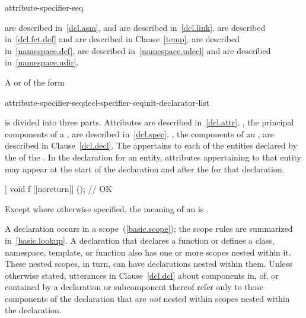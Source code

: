 \begin{bnf}
\br
    \terminal{;}
\end{bnf}

\begin{bnf}
\br
    attribute-specifier-seq \terminal{;}
\end{bnf}

\enternote
{} are described in~\ref{dcl.asm}, and
 are described in~\ref{dcl.link}.
 are described in~\ref{dcl.fct.def} and
 are described in Clause~\ref{temp}.
 are described in~\ref{namespace.def},
 are described in~\ref{namespace.udecl} and
 are described in~\ref{namespace.udir}.
\exitnote

\pnum
A
 or
 of the form

\begin{ncsimplebnf}
attribute-specifier-seq\opt decl-specifier-seq\opt init-declarator-list\opt \terminal{;}
\end{ncsimplebnf}

is divided into three parts.
Attributes are described in~\ref{dcl.attr}.
, the principal components of
a , are described in~\ref{dcl.spec}.
, the components of an
, are described in Clause~\ref{dcl.decl}.
The 
appertains to each of the entities declared by
the 
of the .
\enternote In the declaration for an entity, attributes appertaining to that
entity may appear at the start of the declaration and after the
 for that declaration.
\exitnote \enterexample
\begin{codeblock}
[[noreturn]] void f [[noreturn]] (); // OK
\end{codeblock}
\exitexample

\pnum
Except where otherwise specified, the meaning of an 
is .

\pnum
{}%
%
A declaration occurs in a scope~(\ref{basic.scope}); the scope rules are
summarized in~\ref{basic.lookup}. A declaration that declares a function
or defines a class, namespace, template, or function also has one or
more scopes nested within it. These nested scopes, in turn, can have
declarations nested within them. Unless otherwise stated, utterances in
Clause~\ref{dcl.dcl} about components in, of, or contained by a
declaration or subcomponent thereof refer only to those components of
the declaration that are \emph{not} nested within scopes nested within
the declaration.

